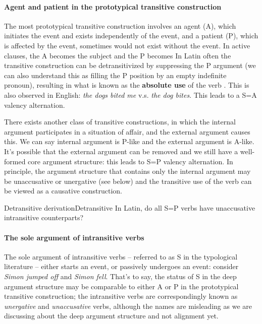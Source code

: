 \documentclass[a4paper, oneside, 12pt]{report}
\newcommand*{\citesec}[1]{\S~{#1}}
\newcommand*{\concept}[1]{\textbf{#1}}
\newcommand*{\term}[1]{\emph{#1}}
\newcommand{\form}[1]{\emph{#1}}
\begin{document}
\paragraph*{Agent and patient in the prototypical transitive construction}
\label{sec:grammatical.clause.core.transitive}
The most prototypical transitive construction
involves an agent (A), which initiates the event
and exists independently of the event,
and a patient (P), which is affected by the event,
sometimes would not exist without the event.
In active clauses, the A becomes the subject
and the P becomes 
In Latin often the transitive construction can be detransitivized
by suppressing the P argument
(we can also understand this as filling the P position by an empty indefinite pronoun),
resulting in what is known as the \concept{absolute use} of the verb
\citep[\citesec{9.16}]{Pinkster1}.
This is also observed in English: \form{the dogs bited me} v.s. \form{the dog bites}.
This leads to a S=A valency alternation. 

There exists another class of transitive constructions,
in which the internal argument participates in a situation of affair,
and the external argument causes this.
We can say internal argument is P-like and the external argument is A-like.
It's possible that the external argument can be removed
and we still have a well-formed core argument structure:
this leads to S=P valency alternation.
In principle, the argument structure that contains only the internal argument
may be unaccusative or unergative (see below)
and the transitive use of the verb can be viewed as a causative construction.

\begin{todobox}{Detransitive derivation}{Detransitive}
    In Latin, do all S=P verbs have unaccusative intransitive counterparts?
\end{todobox}

\paragraph*{The sole argument of intransitive verbs}
\label{sec:grammatical.clause.core.intransitive}
The sole argument of intransitive verbs -- referred to as S in the typological literature --
either starts an event,
or passively undergoes an event:
consider \form{Simon jumped off} and \form{Simon fell}.
That's to say, the status of S in the deep argument structure 
may be comparable to either A or P in the prototypical transitive construction;
the intransitive verbs are correspondingly known as \term{unergative} and \term{unaccusative} verbs,
although the names are misleading as we are discussing about the deep argument structure
and not alignment yet.
\end{document}
